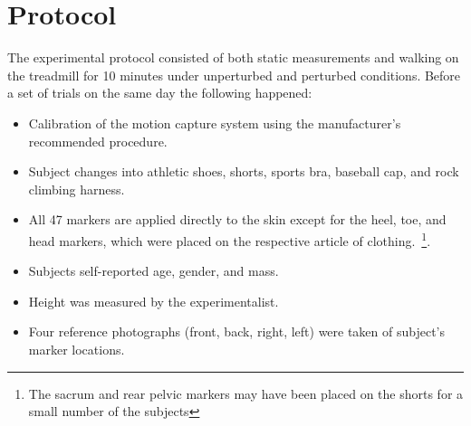 \documentclass[fleqn,10pt]{wlpeerj}
\begin{document}
\section*{Protocol}
%
The experimental protocol consisted of both static measurements and walking on
the treadmill for 10 minutes under unperturbed and perturbed conditions. Before
a set of trials on the same day the following happened:
%
\begin{itemize}
  \item Calibration of the motion capture system using the manufacturer's
    recommended procedure.
  \item Subject changes into athletic shoes, shorts, sports bra, baseball
    cap, and rock climbing harness.
  \item All 47 markers are applied directly to the skin except for the heel,
    toe, and head markers, which were placed on the respective article of
    clothing.~\footnote{The sacrum and rear pelvic markers may have been placed
    on the shorts for a small number of the subjects}.
  \item Subjects self-reported age, gender, and mass.
  \item Height was measured by the experimentalist.
  \item Four reference photographs (front, back, right, left) were taken of
    subject's marker locations.
\end{itemize}
\end{document}
